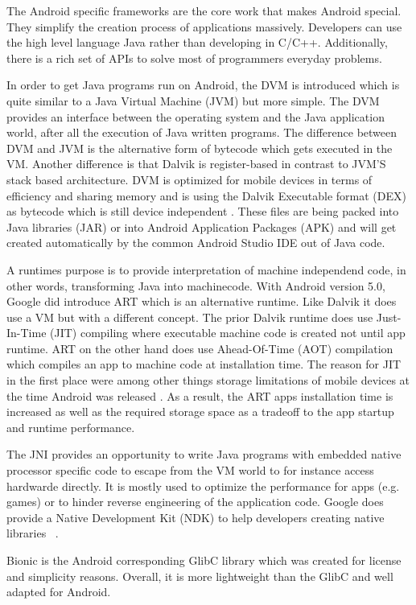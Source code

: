 The Android specific frameworks are the core work that makes Android
special. They simplify the creation process of applications massively.
Developers can use the high level language Java rather than developing
in C/C++. Additionally, there is a rich set of APIs to solve most of
programmers everyday problems.

In order to get Java programs run on Android, the DVM is introduced
which is quite similar to a Java Virtual Machine (JVM) but more simple.
The DVM provides an interface between the operating system and
the Java application world, after all the execution of Java written programs.
The difference between DVM and JVM is the alternative form of bytecode
which gets executed in the VM. Another difference is that Dalvik is
register-based in contrast to JVM'S stack based architecture.
DVM is optimized for mobile devices
in terms of efficiency and sharing memory and is using the
Dalvik Executable format (DEX) as bytecode which is still device
independent \parencite{levin}. These  files are being
packed into Java libraries (JAR) or into Android Application Packages (APK)
and will get created automatically by the common Android Studio IDE out
of Java code.

A runtimes purpose is to provide
interpretation of machine independend code, in other words,
transforming Java into machinecode.
With Android version 5.0, Google did introduce ART which is an
alternative runtime. Like Dalvik it does use a VM but with a
different concept.
The prior Dalvik runtime does use Just-In-Time (JIT) compiling
where executable machine code is created not until app runtime.
ART on the other hand does use Ahead-Of-Time (AOT) compilation
which compiles an app to machine code at installation time.
The reason for JIT in the first place were among other things
storage limitations of mobile devices at the time Android was released
\parencite{levin}. As a result, the ART apps installation time
is increased as well as the required storage space as a tradeoff
to the app startup and runtime performance.

The JNI provides an opportunity to write Java programs with embedded
native processor specific code to escape from the VM world to for
instance access hardwarde directly.
It is mostly used to optimize the performance for apps (e.g. games)
or to hinder reverse engineering of the application code.
Google does provide a Native Development Kit (NDK) to help
developers creating native libraries ~\parencite{ndk}.

Bionic is the Android corresponding GlibC library which was created
for license and simplicity reasons. Overall, it is more lightweight
than the GlibC and well adapted for Android.

